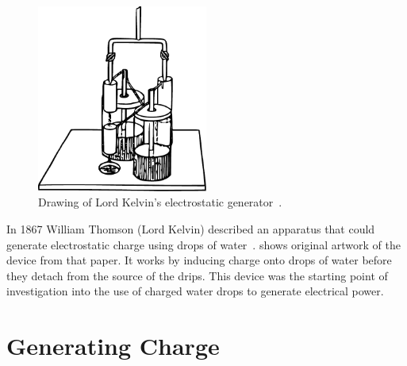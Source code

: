 \begin{figure}
    \centering
    \includegraphics[width=0.5\textwidth]{content/appendices/chargedWaterDrops/graphics/Figure_Drawing_KelvinWaterDripper_OriginalDevice}
    \caption{Drawing of Lord Kelvin's electrostatic generator~\cite{Thomson1867a}.}
    \label{Figure_Drawing_KelvinWaterDripper_OriginalDevice}
\end{figure}
In 1867 William Thomson (Lord Kelvin) described an apparatus that could generate electrostatic charge using drops of water~\cite{Thomson1867}.
 shows original artwork of the device from that paper.
It works by inducing charge onto drops of water before they detach from the source of the drips.
This device was the starting point of investigation into the use of charged water drops to generate electrical power.


\section{Generating Charge}

